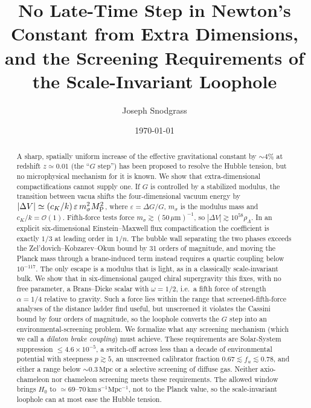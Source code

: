 \documentclass[aps,prd,reprint,superscriptaddress,nofootinbib,floatfix]{revtex4-2}
\theoremstyle{definition}
\newcommand{\MP}{M_{\rm P}}
\newcommand{\Mpc}{\,\mathrm{Mpc}}
\newcommand{\um}{\,\mu\mathrm{m}}
\begin{document}
\title{No Late-Time Step in Newton's Constant from Extra Dimensions,\\
and the Screening Requirements of the Scale-Invariant Loophole}

\author{Joseph Snodgrass}

\date{\today}

\begin{abstract}
A sharp, spatially uniform increase of the effective gravitational constant by $\sim\!4\%$ at redshift $z\simeq0.01$ (the ``$G$ step'') has been proposed to resolve the Hubble tension, but no microphysical mechanism for it is known. We show that extra-dimensional compactifications cannot supply one. If $G$ is controlled by a stabilized modulus, the transition between vacua shifts the four-dimensional vacuum energy by $|\Delta V| \simeq (c_K/k)\,\varepsilon\, m_\sigma^2 \MP^2$, where $\varepsilon=\Delta G/G$, $m_\sigma$ is the modulus mass and $c_K/k=\mathcal{O}(1)$. Fifth-force tests force $m_\sigma \gtrsim (50\um)^{-1}$, so $|\Delta V| \gtrsim 10^{58}\rho_\Lambda$. In an explicit six-dimensional Einstein--Maxwell flux compactification the coefficient is exactly $1/3$ at leading order in $1/n$. The bubble wall separating the two phases exceeds the Zel'dovich--Kobzarev--Okun bound by 31 orders of magnitude, and moving the Planck mass through a brane-induced term instead requires a quartic coupling below $10^{-117}$. The only escape is a modulus that is light, as in a classically scale-invariant bulk. We show that in six-dimensional gauged chiral supergravity this fixes, with no free parameter, a Brans--Dicke scalar with $\omega=1/2$, i.e.\ a fifth force of strength $\alpha=1/4$ relative to gravity. Such a force lies within the range that screened-fifth-force analyses of the distance ladder find useful, but unscreened it violates the Cassini bound by four orders of magnitude, so the loophole converts the $G$ step into an environmental-screening problem. We formalize what any screening mechanism (which we call a \emph{dilaton brake coupling}) must achieve. These requirements are Solar-System suppression $\le 4.6\times10^{-5}$, a switch-off across less than a decade of environmental potential with steepness $p\gtrsim5$, an unscreened calibrator fraction $0.67\lesssim f_u\lesssim0.78$, and either a range below $\sim\!0.3\Mpc$ or a selective screening of diffuse gas. Neither axio-chameleon nor chameleon screening meets these requirements. The allowed window brings $H_0$ to $\simeq 69\text{--}70\,\mathrm{km\,s^{-1}Mpc^{-1}}$, not to the Planck value, so the scale-invariant loophole can at most ease the Hubble tension.
\end{abstract}
\end{document}
